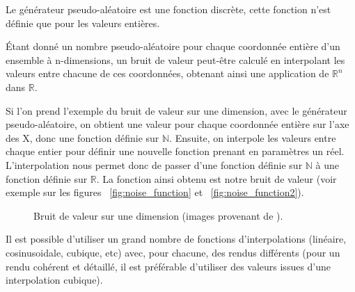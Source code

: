 Le générateur pseudo-aléatoire est une fonction discrète, cette fonction
n'est définie que pour les valeurs entières.

\'Etant donné un nombre pseudo-aléatoire pour chaque coordonnée entière d'un
ensemble à n-dimensions, un bruit de valeur peut-être calculé en interpolant les
valeurs entre chacune de ces coordonnées, obtenant ainsi une application
de $\mathbb R^n$ dans $\mathbb R$.

Si l'on prend l'exemple du bruit de valeur sur une dimension, avec le
générateur pseudo-aléatoire, on obtient une valeur pour chaque coordonnée
entière sur l'axe des X, donc une fonction définie sur $\mathbb N$.
Ensuite, on interpole les valeurs entre chaque entier pour définir une nouvelle fonction prenant en paramètres
un réel. L'interpolation nous permet donc de passer d'une fonction définie sur
$\mathbb N$ à une fonction définie sur $\mathbb R$. La fonction ainsi obtenu
est notre bruit de valeur (voir exemple sur les figures ~\ref{fig:noise_function} et ~\ref{fig:noise_function2}).

\begin{figure}[htp]
  \centering
  \caption{Bruit de valeur sur une dimension (images provenant de
    \cite{PerlinWeb}).}
\end{figure}

Il est possible d'utiliser un grand nombre de fonctions d'interpolations
(linéaire, cosinusoidale, cubique, etc) avec, pour chacune, des rendus
différents (pour un rendu cohérent et détaillé, il est préférable d'utiliser des
valeurs issues d'une interpolation cubique).

